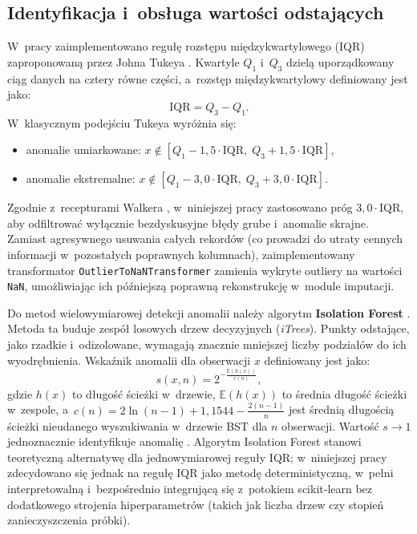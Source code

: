 \subsection{Identyfikacja i~obsługa wartości odstających}
W~pracy zaimplementowano regułę rozstępu międzykwartylowego (IQR) zaproponowaną przez Johna Tukeya \cite{Tukey1977}. Kwartyle $Q_1$ i~$Q_3$ dzielą uporządkowany ciąg danych na cztery równe części, a~rozstęp międzykwartylowy definiowany jest jako:
\begin{equation}
\mathrm{IQR} = Q_3 - Q_1.
\end{equation}
W~klasycznym podejściu Tukeya \cite{Tukey1977} wyróżnia się:
\begin{itemize}
    \item anomalie umiarkowane: $x \notin [Q_1 - 1{,}5 \cdot \mathrm{IQR}, \; Q_3 + 1{,}5 \cdot \mathrm{IQR}]$,
    \item anomalie ekstremalne: $x \notin [Q_1 - 3{,}0 \cdot \mathrm{IQR}, \; Q_3 + 3{,}0 \cdot \mathrm{IQR}]$.
\end{itemize}
Zgodnie z~recepturami Walkera \cite{Walker2021}, w~niniejszej pracy zastosowano próg $3{,}0 \cdot \mathrm{IQR}$, aby odfiltrować wyłącznie bezdyskusyjne błędy grube i~anomalie skrajne. Zamiast agresywnego usuwania całych rekordów (co prowadzi do utraty cennych informacji w~pozostałych poprawnych kolumnach), zaimplementowany transformator \texttt{OutlierToNaNTransformer} zamienia wykryte outliery na wartości \texttt{NaN}, umożliwiając ich późniejszą poprawną rekonstrukcję w~module imputacji.

Do metod wielowymiarowej detekcji anomalii należy algorytm \textbf{Isolation Forest} \cite{Liu2008}. Metoda ta buduje zespół losowych drzew decyzyjnych (\textit{iTrees}). Punkty odstające, jako rzadkie i~odizolowane, wymagają znacznie mniejszej liczby podziałów do ich wyodrębnienia. Wskaźnik anomalii dla obserwacji $x$ definiowany jest jako:
\begin{equation}
s(x, n) = 2^{-\frac{\mathbb{E}(h(x))}{c(n)}},
\end{equation}
gdzie $h(x)$ to długość ścieżki w~drzewie, $\mathbb{E}(h(x))$ to średnia długość ścieżki w~zespole, a~$c(n) = 2\ln(n - 1) + 1{,}1544 - \frac{2(n - 1)}{n}$ jest średnią długością ścieżki nieudanego wyszukiwania w~drzewie BST dla $n$ obserwacji. Wartość $s \to 1$ jednoznacznie identyfikuje anomalię \cite{Liu2008}. Algorytm Isolation Forest stanowi teoretyczną alternatywę dla jednowymiarowej reguły IQR; w~niniejszej pracy zdecydowano się jednak na regułę IQR jako metodę deterministyczną, w~pełni interpretowalną i~bezpośrednio integrującą się z~potokiem scikit-learn bez dodatkowego strojenia hiperparametrów (takich jak liczba drzew czy stopień zanieczyszczenia próbki).

